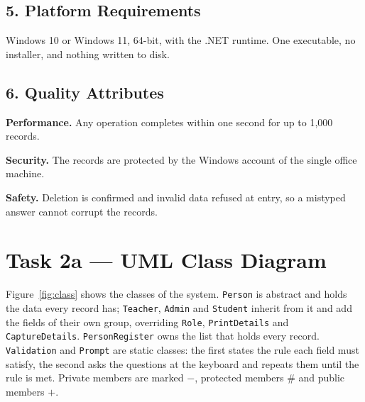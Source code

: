 \documentclass[11pt,a4paper]{article}
\begin{document}
\subsection*{5. Platform Requirements}

Windows 10 or Windows 11, 64-bit, with the .NET runtime. One executable, no
installer, and nothing written to disk.

\subsection*{6. Quality Attributes}

\textbf{Performance.} Any operation completes within one second for up to 1,000
records.

\textbf{Security.} The records are protected by the Windows account of the
single office machine.

\textbf{Safety.} Deletion is confirmed and invalid data refused at entry, so a
mistyped answer cannot corrupt the records.

\clearpage
\section*{Task 2a --- UML Class Diagram}

Figure~\ref{fig:class} shows the classes of the system. \texttt{Person} is
abstract and holds the data every record has; \texttt{Teacher}, \texttt{Admin}
and \texttt{Student} inherit from it and add the fields of their own group,
overriding \texttt{Role}, \texttt{PrintDetails} and \texttt{CaptureDetails}.
\texttt{PersonRegister} owns the list that holds every record.
\texttt{Validation} and \texttt{Prompt} are static classes: the first states the
rule each field must satisfy, the second asks the questions at the keyboard and
repeats them until the rule is met. Private members are marked $-$, protected
members $\#$ and public members $+$.
\end{document}
